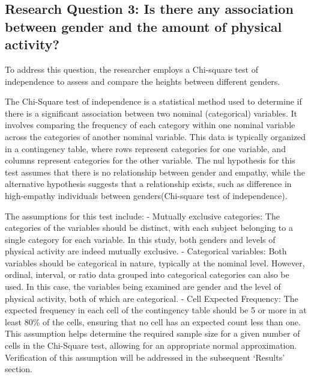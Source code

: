 \documentclass[
]{article}
\begin{document}
\hypertarget{research-question-3-is-there-any-association-between-gender-and-the-amount-of-physical-activity}{%
\subsection{Research Question 3: Is there any association between gender and the amount of physical activity?}\label{research-question-3-is-there-any-association-between-gender-and-the-amount-of-physical-activity}}

To address this question, the researcher employs a Chi-square test of independence to assess and compare the heights between different genders.

The Chi-Square test of independence is a statistical method used to determine if there is a significant association between two nominal (categorical) variables. It involves comparing the frequency of each category within one nominal variable across the categories of another nominal variable. This data is typically organized in a contingency table, where rows represent categories for one variable, and columns represent categories for the other variable. The nul hypothesis for this test assumes that there is no relationship between gender and empathy, while the alternative hypothesis suggests that a relationship exists, such as difference in high-empathy individuals between genders(Chi-square test of independence).

The assumptions for this test include:
- Mutually exclusive categories: The categories of the variables should be distinct, with each subject belonging to a single category for each variable. In this study, both genders and levels of physical activity are indeed mutually exclusive.
- Categorical variables: Both variables should be categorical in nature, typically at the nominal level. However, ordinal, interval, or ratio data grouped into categorical categories can also be used. In this case, the variables being examined are gender and the level of physical activity, both of which are categorical.
- Cell Expected Frequency: The expected frequency in each cell of the contingency table should be 5 or more in at least 80\% of the cells, ensuring that no cell has an expected count less than one. This assumption helps determine the required sample size for a given number of cells in the Chi-Square test, allowing for an appropriate normal approximation. Verification of this assumption will be addressed in the subsequent `Results' section.

\newpage
\end{document}
